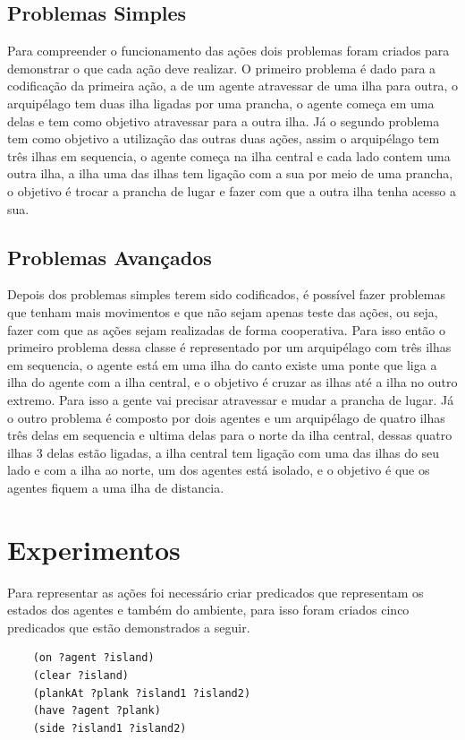 \documentclass[letterpaper]{article}
\begin{document}
\subsection{Problemas Simples}
Para compreender o funcionamento das ações dois problemas foram criados para demonstrar o que cada ação deve realizar. O primeiro problema é dado para a codificação da primeira ação, a de um agente atravessar de uma ilha para outra, o arquipélago tem duas ilha ligadas por uma prancha, o agente começa em uma delas e tem como objetivo atravessar para a outra ilha. Já o segundo problema tem como objetivo a utilização das outras duas ações, assim o arquipélago tem três ilhas em sequencia, o agente começa na ilha central e cada lado contem uma outra ilha, a ilha uma das ilhas tem ligação com a sua por meio de uma prancha, o objetivo é trocar a prancha de lugar e fazer com que a outra ilha tenha acesso a sua. 

\subsection{Problemas Avançados}
Depois dos problemas simples terem sido codificados, é possível fazer problemas que tenham mais movimentos e que não sejam apenas teste das ações, ou seja, fazer com que as ações sejam realizadas de forma cooperativa. Para isso então o primeiro problema dessa classe é representado por um arquipélago com três ilhas em sequencia, o agente está em uma ilha do canto existe uma ponte que liga a ilha do agente com a ilha central, e o objetivo é cruzar as ilhas até a ilha no outro extremo. Para isso a gente vai precisar atravessar e mudar a prancha de lugar. Já o outro problema é composto por dois agentes e um arquipélago de quatro ilhas três delas em sequencia e ultima delas para o norte da ilha central, dessas quatro ilhas 3 delas estão ligadas, a ilha central tem ligação com uma das ilhas do seu lado e com a ilha ao norte, um dos agentes está isolado, e o objetivo é que os agentes fiquem a uma ilha de distancia. 

\section{Experimentos}

Para representar as ações foi necessário criar predicados que representam os estados dos agentes e também do ambiente, para isso foram criados cinco predicados que estão demonstrados a seguir.

 \begin{verbatim}
    (on ?agent ?island)
    (clear ?island)
    (plankAt ?plank ?island1 ?island2)
    (have ?agent ?plank)
    (side ?island1 ?island2)
\end{verbatim}
\end{document}
